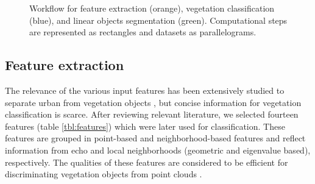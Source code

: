\begin{figure}
	\caption{Workflow for feature extraction (orange), vegetation classification (blue), and linear objects segmentation (green). Computational steps are represented as rectangles and datasets as parallelograms.}
	\label{fig:workflow}
\end{figure}

\subsection{Feature extraction}

The relevance of the various input features has been extensively studied to separate urban from vegetation objects \citep{chehata2009airborne, guo2011relevance, mallet2011relevance}, but concise information for vegetation classification is scarce. After reviewing relevant literature, we selected fourteen features (table \ref{tbl:features}) which were later used for classification. These features are grouped in point-based and neighborhood-based features and reflect information from echo and local neighborhoods (geometric and eigenvalue based), respectively. The qualities of these features are considered to be efficient for discriminating vegetation objects from point clouds \citep{chehata2009airborne}.

